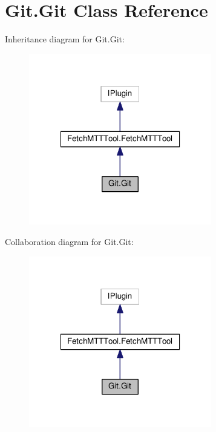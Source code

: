 \hypertarget{classGit_1_1Git}{\section{Git.\-Git Class Reference}
\label{classGit_1_1Git}
}


Inheritance diagram for Git.\-Git\-:
\nopagebreak
\begin{figure}[H]
\begin{center}
\leavevmode
\includegraphics[width=226pt]{classGit_1_1Git__inherit__graph}
\end{center}
\end{figure}


Collaboration diagram for Git.\-Git\-:
\nopagebreak
\begin{figure}[H]
\begin{center}
\leavevmode
\includegraphics[width=226pt]{classGit_1_1Git__coll__graph}
\end{center}
\end{figure}
